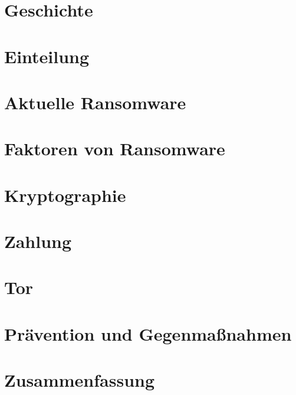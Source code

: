 \documentclass[runningheads,a4paper]{llncs}
\begin{document}
\section{Geschichte}


\section{Einteilung}


\section{Aktuelle Ransomware}


\section{Faktoren von Ransomware}


\section{Kryptographie}


\section{Zahlung}


\section{Tor}


\section{Prävention und Gegenmaßnahmen}


\section{Zusammenfassung}







\end{document}
